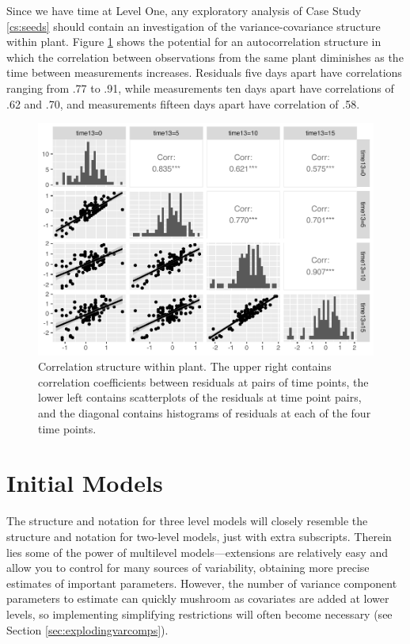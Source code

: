 \documentclass[
]{krantz}
\begin{document}
Since we have time at Level One, any exploratory analysis of Case Study \ref{cs:seeds} should contain an investigation of the variance-covariance structure within plant. Figure \ref{fig:corrstruct} shows the potential for an autocorrelation structure in which the correlation between observations from the same plant diminishes as the time between measurements increases. Residuals five days apart have correlations ranging from .77 to .91, while measurements ten days apart have correlations of .62 and .70, and measurements fifteen days apart have correlation of .58.

\begin{figure}

{\centering \includegraphics[width=0.6\linewidth]{bookdown-BeyondMLR_files/figure-latex/corrstruct-1} 

}

\caption{Correlation structure within plant.  The upper right contains correlation coefficients between residuals at pairs of time points, the lower left contains scatterplots of the residuals at time point pairs, and the diagonal contains histograms of residuals at each of the four time points.}\label{fig:corrstruct}
\end{figure}

\section{Initial Models}\label{initialmodels-3level}

The structure and notation for three level models will closely resemble the structure and notation for two-level models, just with extra subscripts. Therein lies some of the power of multilevel models---extensions are relatively easy and allow you to control for many sources of variability, obtaining more precise estimates of important parameters. However, the number of variance component parameters to estimate can quickly mushroom as covariates are added at lower levels, so implementing simplifying restrictions will often become necessary (see Section \ref{sec:explodingvarcomps}).
\end{document}
